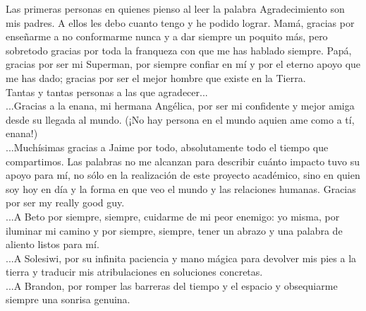 \documentclass[
11pt, %
spanish, %
singlespacing, %
headsepline, %
]{MastersDoctoralThesis} %
\begin{document}

\begin{acknowledgements}
\addchaptertocentry{\acknowledgementname} %

Las primeras personas en quienes pienso al leer la palabra Agradecimiento son mis padres. A ellos les debo cuanto tengo y he podido lograr. Mamá, gracias por enseñarme a no conformarme nunca y a dar siempre un poquito más, pero sobretodo gracias por toda la franqueza con que me has hablado siempre. Papá, gracias por ser mi Superman, por siempre confiar en mí y por el eterno apoyo que me has dado; gracias por ser el mejor hombre que existe en la Tierra.\\

Tantas y tantas personas a las que agradecer...\\

...Gracias a la enana, mi hermana Angélica, por ser mi confidente y mejor amiga desde su llegada al mundo. (¡No hay persona en el mundo aquien ame como a tí, enana!) \\

...Muchísimas gracias a Jaime por todo, absolutamente todo el tiempo que compartimos. Las palabras no me alcanzan para describir cuánto impacto tuvo su apoyo para mí, no sólo en la realización de este proyecto académico, sino en quien soy hoy en día y la forma en que veo el mundo y las relaciones humanas. Gracias por ser my really good guy.\\

...A Beto por siempre, siempre, cuidarme de mi peor enemigo: yo misma, por iluminar mi camino y por siempre, siempre, tener un abrazo y una palabra de aliento listos para mí. \\


...A Solesiwi, por su infinita paciencia y mano mágica para devolver mis pies a la tierra y traducir mis atribulaciones en soluciones concretas.\\

...A Brandon, por romper las barreras del tiempo y el espacio y obsequiarme siempre una sonrisa genuina.\\


\end{acknowledgements}
\end{document}
